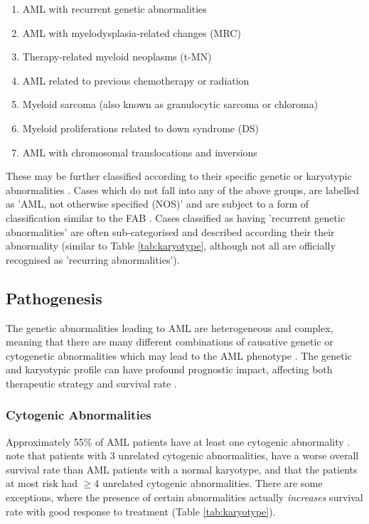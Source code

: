 \begin{enumerate} \itemsep-0.5em
\item AML with recurrent genetic abnormalities
\item AML with myelodysplasia-related changes (MRC)
\item Therapy-related myeloid neoplasms (t-MN)
\item AML related to previous chemotherapy or radiation
\item Myeloid sarcoma (also known as granulocytic sarcoma or chloroma)
\item Myeloid proliferations related to down syndrome (DS)
\item AML with chromosomal translocations and inversions
\end{enumerate}

These may be further classified according to their specific genetic or karyotypic abnormalities \citep{whoclassification}. Cases which do not fall into any of the above groups, are labelled as 'AML, not otherwise specified (NOS)' and are subject to a form of classification similar to the \ac{FAB} \citep{ACS2018}. Cases classified as having 'recurrent genetic abnormalities' are often sub-categorised and described according their their abnormality (similar to Table \ref{tab:karyotype}, although not all are officially recognised as 'recurring abnormalities').


\subsection{Pathogenesis}
\label{Pathogenesis}
The genetic abnormalities leading to \ac{AML} are heterogeneous and complex, meaning that there are many different combinations of causative genetic or cytogenetic abnormalities which may lead to the \ac{AML} phenotype \citep{lindsley2015acute, whoclassification}. The genetic and karyotypic profile can have profound prognostic impact, affecting both therapeutic strategy and survival rate \citep{mrozek2000prognostic, whoclassification}. 

\subsubsection{Cytogenic Abnormalities}
Approximately 55\% of \ac{AML} patients have at least one cytogenic abnormality \citep{meyer2014translational}.  \cite{stolzel2016karyotype} note that patients with 3 unrelated cytogenic abnormalities, have a worse overall survival rate than \ac{AML} patients with a normal karyotype, and that the patients at most risk had $ \geq $4 unrelated cytogenic abnormalities. There are some exceptions, where the presence of certain abnormalities actually \textit{increases} survival rate with good response to treatment (Table \ref{tab:karyotype}). 

